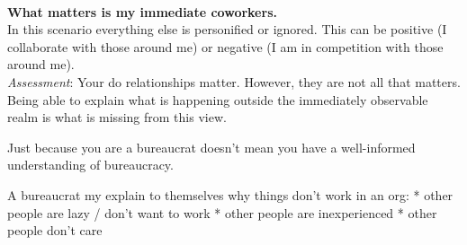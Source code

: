\ \\

\textbf{What matters is my immediate coworkers.}\\
In this scenario everything else is personified or ignored. This can be positive (I collaborate with those around me) or negative (I am in competition with those around me). \\
\textit{Assessment}: Your do relationships matter. However, they are not all that matters. Being able to explain what is happening outside the immediately observable realm is what is missing from this view. 



Just because you are a bureaucrat doesn't mean you have a well-informed understanding of bureaucracy. 

A bureaucrat my explain to themselves why things don't work in an org:
* other people are lazy / don't want to work
* other people are inexperienced
* other people don't care